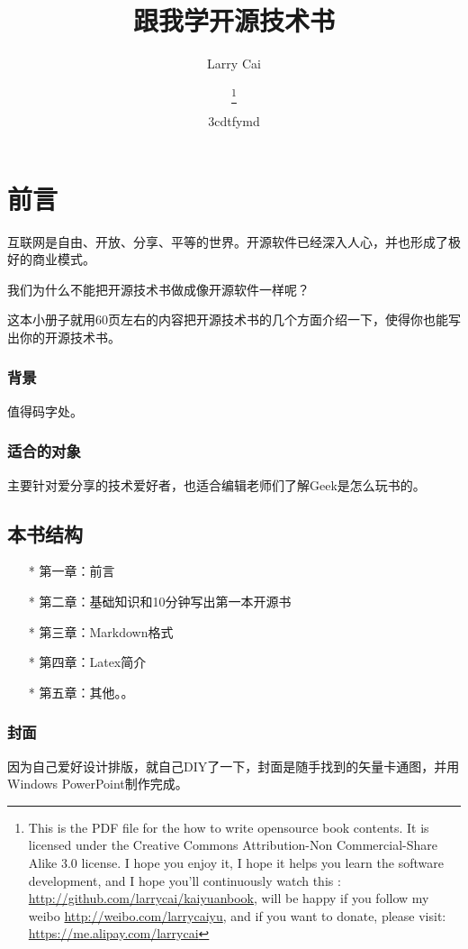 \documentclass[a4paper]{book}
\title{{跟我学开源技术书}}
\author{Larry Cai}
\title{\huge{\savedtitle}}
\author{\textbf{\savedauthor}\thanks{This is the PDF file for the how to write opensource book contents. It is licensed under the Creative Commons Attribution-Non Commercial-Share Alike 3.0 license. I hope you enjoy it, I hope it helps you learn the software development, and I hope you'll continuously watch this : \url{http://github.com/larrycai/kaiyuanbook}, will be happy if you follow my weibo \url{http://weibo.com/larrycaiyu}, and if you want to donate, please visit: \url{https://me.alipay.com/larrycai}}}
\date{\w3cdtfymd}
\begin{document}
\maketitle
\thispagestyle{empty}
\setcounter{tocdepth}{4}

\frontmatter
\chapter*{前言}

互联网是自由、开放、分享、平等的世界。开源软件已经深入人心，并也形成了极好的商业模式。

我们为什么不能把开源技术书做成像开源软件一样呢？

这本小册子就用60页左右的内容把开源技术书的几个方面介绍一下，使得你也能写出你的开源技术书。

\subsection*{背景}

值得码字处。

\subsection*{适合的对象}

主要针对爱分享的技术爱好者，也适合编辑老师们了解Geek是怎么玩书的。

\section*{本书结构}

\begin{itemize}\setlength{\itemsep}{1pt}\setlength{\parskip}{0pt}\setlength{\parsep}{0pt}
\item[*]
  第一章：前言
\item[*]
  第二章：基础知识和10分钟写出第一本开源书
\item[*]
  第三章：Markdown格式
\item[*]
  第四章：Latex简介
\item[*]
  第五章：其他。。
\end{itemize}
\subsection*{封面}

因为自己爱好设计排版，就自己DIY了一下，封面是随手找到的矢量卡通图，并用Windows PowerPoint制作完成。
\end{document}
